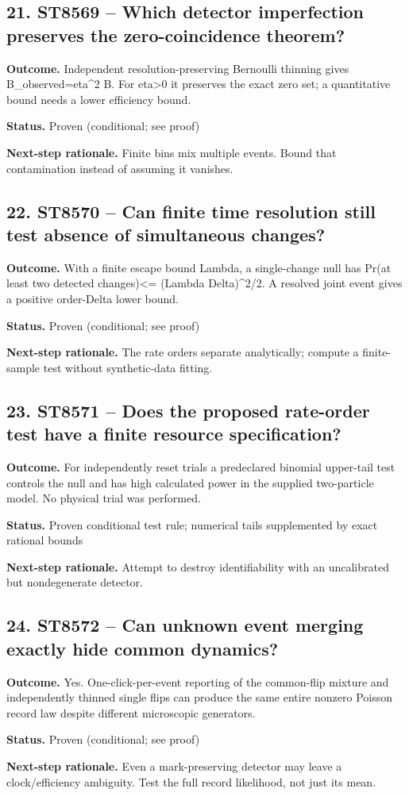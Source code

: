 \subsection*{21. ST8569 -- Which detector imperfection preserves the zero-coincidence theorem?}
\noindent\textbf{Outcome.} Independent resolution-preserving Bernoulli thinning gives B\_observed=eta\textasciicircum{}2 B. For eta\textgreater{}0 it preserves the exact zero set; a quantitative bound needs a lower efficiency bound.\par
\noindent\textbf{Status.} Proven (conditional; see proof)\par
\noindent\textbf{Next-step rationale.} Finite bins mix multiple events. Bound that contamination instead of assuming it vanishes.\par\medskip
\subsection*{22. ST8570 -- Can finite time resolution still test absence of simultaneous changes?}
\noindent\textbf{Outcome.} With a finite escape bound Lambda, a single-change null has Pr(at least two detected changes)\textless{}= (Lambda Delta)\textasciicircum{}2/2. A resolved joint event gives a positive order-Delta lower bound.\par
\noindent\textbf{Status.} Proven (conditional; see proof)\par
\noindent\textbf{Next-step rationale.} The rate orders separate analytically; compute a finite-sample test without synthetic-data fitting.\par\medskip
\subsection*{23. ST8571 -- Does the proposed rate-order test have a finite resource specification?}
\noindent\textbf{Outcome.} For independently reset trials a predeclared binomial upper-tail test controls the null and has high calculated power in the supplied two-particle model. No physical trial was performed.\par
\noindent\textbf{Status.} Proven conditional test rule; numerical tails supplemented by exact rational bounds\par
\noindent\textbf{Next-step rationale.} Attempt to destroy identifiability with an uncalibrated but nondegenerate detector.\par\medskip
\subsection*{24. ST8572 -- Can unknown event merging exactly hide common dynamics?}
\noindent\textbf{Outcome.} Yes. One-click-per-event reporting of the common-flip mixture and independently thinned single flips can produce the same entire nonzero Poisson record law despite different microscopic generators.\par
\noindent\textbf{Status.} Proven (conditional; see proof)\par
\noindent\textbf{Next-step rationale.} Even a mark-preserving detector may leave a clock/efficiency ambiguity. Test the full record likelihood, not just its mean.\par\medskip
